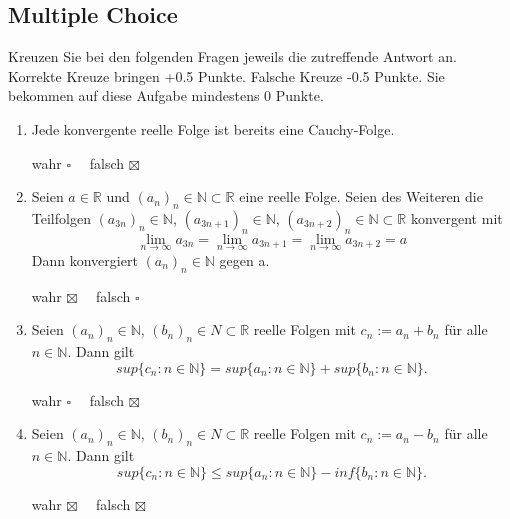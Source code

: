 \documentclass[a4paper]{article}
\begin{document}
\setcounter{section}{3}
\subsection{Multiple Choice}
Kreuzen Sie bei den folgenden Fragen jeweils die zutreffende Antwort an. Korrekte Kreuze bringen +0.5 Punkte. Falsche Kreuze -0.5 Punkte. Sie bekommen auf diese Aufgabe mindestens 0 Punkte.

\begin{enumerate}[label=(\alph*)]
    \item Jede konvergente reelle Folge ist bereits eine Cauchy-Folge. \begin{flushright} wahr $\square \quad$ falsch $\boxtimes$ \end{flushright}
    \item Seien $a \in \mathbb{R}$ und $(a_n)_n \in \mathbb{N} \subset \mathbb{R}$ eine reelle Folge. Seien des Weiteren die Teilfolgen $(a_{3n})_n \in \mathbb{N}$, $(a_{3n+1})_n \in \mathbb{N}$, $(a_{3n+2})_n \in \mathbb{N} \subset \mathbb{R}$ konvergent mit
    \[
    \lim\limits_{n \to \infty} a_{3n} = \lim\limits_{n \to \infty} a_{3n + 1} = \lim\limits_{n \to \infty} a_{3n + 2} = a
    \]
    Dann konvergiert $(a_n)_n \in \mathbb{N}$ gegen a.
    \begin{flushright} wahr $\boxtimes \quad$ falsch $\square$ \end{flushright}
    \item Seien $(a_n)_n \in \mathbb{N}$, $(b_n)_n \in N \subset \mathbb{R}$ reelle Folgen mit $c_n := a_n + b_n$ für alle $n \in \mathbb{N}$. Dann gilt
    \[
        sup\{c_n : n \in \mathbb{N}\} = sup\{a_n : n \in \mathbb{N}\} + sup\{b_n : n \in \mathbb{N}\}.
    \]
    \begin{flushright} wahr $\square \quad$ falsch $\boxtimes$ \end{flushright}
    \item Seien $(a_n)_n \in \mathbb{N}$, $(b_n)_n \in N \subset \mathbb{R}$ reelle Folgen mit $c_n := a_n - b_n$ für alle $n \in \mathbb{N}$. Dann gilt
    \[
        sup\{c_n : n \in \mathbb{N}\} \leq sup\{a_n : n \in \mathbb{N}\} - inf\{b_n : n \in \mathbb{N}\}.
    \]
    \begin{flushright} wahr $\boxtimes \quad$ falsch $\boxtimes$ \end{flushright}
\end{enumerate}
\bigskip
\end{document}
